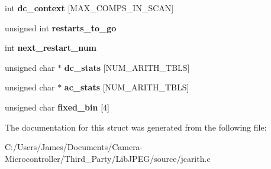 \begin{DoxyCompactItemize}
\item 
\mbox{\label{structarith__entropy__encoder_afd0ab9175e5fe45bf51db9f594e6839f}} 
int {\bfseries dc\+\_\+context} \mbox{[}M\+A\+X\+\_\+\+C\+O\+M\+P\+S\+\_\+\+I\+N\+\_\+\+S\+C\+AN\mbox{]}
\item 
\mbox{\label{structarith__entropy__encoder_a50bb63b0114a26bccea7f609f1eb0d28}} 
unsigned int {\bfseries restarts\+\_\+to\+\_\+go}
\item 
\mbox{\label{structarith__entropy__encoder_a3ff97c7e358a731ef927ec117437d21b}} 
int {\bfseries next\+\_\+restart\+\_\+num}
\item 
\mbox{\label{structarith__entropy__encoder_a6a7c51c53e6f544b595db8b927672093}} 
unsigned char $\ast$ {\bfseries dc\+\_\+stats} \mbox{[}N\+U\+M\+\_\+\+A\+R\+I\+T\+H\+\_\+\+T\+B\+LS\mbox{]}
\item 
\mbox{\label{structarith__entropy__encoder_a6d1dc4cfe4876f9fe0276e6172073fba}} 
unsigned char $\ast$ {\bfseries ac\+\_\+stats} \mbox{[}N\+U\+M\+\_\+\+A\+R\+I\+T\+H\+\_\+\+T\+B\+LS\mbox{]}
\item 
\mbox{\label{structarith__entropy__encoder_a76b5f103286b69e4fa6b22dbf4436f4d}} 
unsigned char {\bfseries fixed\+\_\+bin} \mbox{[}4\mbox{]}
\end{DoxyCompactItemize}


The documentation for this struct was generated from the following file\+:\begin{DoxyCompactItemize}
\item 
C\+:/\+Users/\+James/\+Documents/\+Camera-\/\+Microcontroller/\+Third\+\_\+\+Party/\+Lib\+J\+P\+E\+G/source/jcarith.\+c\end{DoxyCompactItemize}
